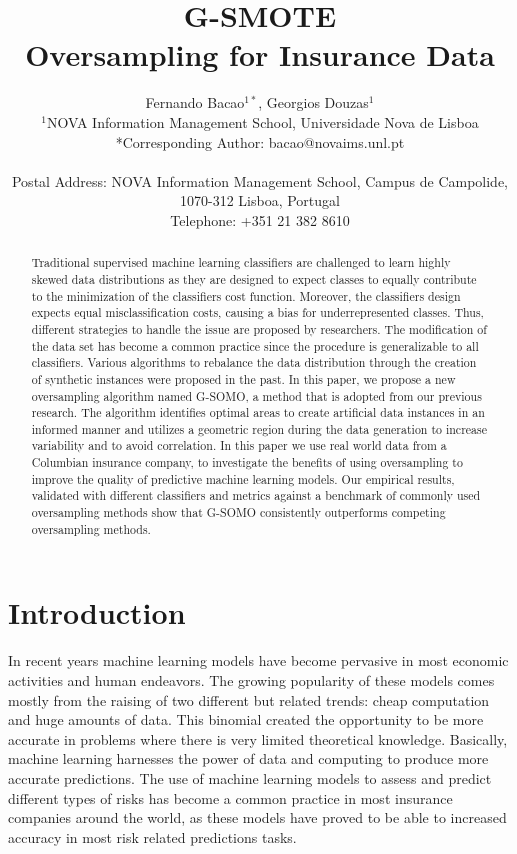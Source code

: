 \documentclass[parskip=full]{scrartcl}
\title{G-SMOTE \\ \LARGE{Oversampling for Insurance Data}}
\author{
	Fernando Bacao\(^{1*}\), Georgios Douzas\(^{1}\)
	\\
	\small{\(^{1}\)NOVA Information Management School, Universidade Nova de Lisboa}
	\\
	\small{*Corresponding Author: bacao@novaims.unl.pt}
	\\
	\\
	\small{Postal Address: NOVA Information Management School, Campus de Campolide, 1070-312 Lisboa, Portugal}
	\\
	\small{Telephone: +351 21 382 8610}
}
\date{}
\begin{document}
\maketitle

\begin{abstract}
Traditional supervised machine learning classifiers are challenged to learn
highly skewed data distributions as they are designed to expect classes to
equally contribute to the minimization of the classifiers cost function.
Moreover, the classifiers design expects equal misclassification costs, causing
a bias for underrepresented classes. Thus, different strategies to handle the
issue are proposed by researchers. The modification of the data set has become a
common practice since the procedure is generalizable to all classifiers. Various
algorithms to rebalance the data distribution through the creation of synthetic
instances were proposed in the past.  In this paper, we propose a new
oversampling algorithm named G-SOMO, a method that is adopted from our previous
research. The algorithm identifies optimal areas to create artificial data
instances in an informed manner and utilizes a geometric region during the data
generation to increase variability and to avoid correlation. In this paper we
use real world data from a Columbian insurance company, to investigate the
benefits of using oversampling to improve the quality of predictive machine
learning models. Our empirical results, validated with different classifiers and
metrics against a benchmark of commonly used oversampling methods show that
G-SOMO consistently outperforms competing oversampling methods.
\end{abstract}

\section{Introduction}

In recent years machine learning models have become pervasive in most economic
activities and human endeavors. The growing popularity of these models comes
mostly from the raising of two different but related trends: cheap computation
and huge amounts of data. This binomial created the opportunity to be more
accurate in problems where there is very limited theoretical knowledge.
Basically, machine learning harnesses the power of data and computing to produce
more accurate predictions. The use of machine learning models to assess and
predict different types of risks has become a common practice in most insurance
companies around the world, as these models have proved to be able to increased
accuracy in most risk related predictions tasks.
\end{document}
